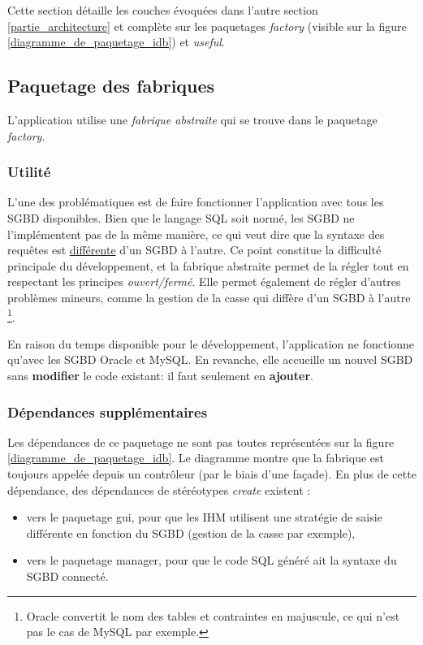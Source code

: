 Cette section détaille les couches évoquées dans l'autre section \ref{partie_architecture} et complète sur les paquetages \textit{factory} (visible sur la figure \ref{diagramme_de_paquetage_idb}) et \textit{useful}.

\subsection{Paquetage des fabriques}
L'application utilise une \textit{fabrique abstraite} qui se trouve dans le paquetage \textit{factory}.

\subsubsection{Utilité}
L'une des problématiques est de faire fonctionner l'application avec tous les SGBD disponibles.
Bien que le langage SQL soit normé, les SGBD ne l'implémentent pas de la même manière, ce qui veut dire que la syntaxe des requêtes est \underline{différente} d'un SGBD à l'autre.
Ce point constitue la difficulté principale du développement, et la fabrique abstraite permet de la régler tout en respectant les principes \textit{ouvert/fermé}. Elle permet également de régler d'autres problèmes mineurs, comme la gestion de la casse qui diffère d'un SGBD à l'autre
\footnote{\label{casse_et_sgbd}Oracle convertit le nom des tables et contraintes en majuscule, ce qui n'est pas le cas de MySQL par exemple.}.

En raison du temps disponible pour le développement, l'application ne fonctionne qu'avec les SGBD Oracle et MySQL.
En revanche, elle accueille un nouvel SGBD sans \textbf{modifier} le code existant: il faut seulement en \textbf{ajouter}. %

\subsubsection{Dépendances supplémentaires}
Les dépendances de ce paquetage ne sont pas toutes représentées sur la figure \ref{diagramme_de_paquetage_idb}.
Le diagramme montre que la fabrique est toujours appelée depuis un contrôleur (par le biais d'une façade).
En plus de cette dépendance, des dépendances de stéréotypes \textit{create} existent :
\begin{itemize}
\item vers le paquetage gui, pour que les IHM utilisent une stratégie de saisie différente en fonction du SGBD (gestion de la casse par exemple),
\item vers le paquetage manager, pour que le code SQL généré ait la syntaxe du SGBD connecté.
\end{itemize}

